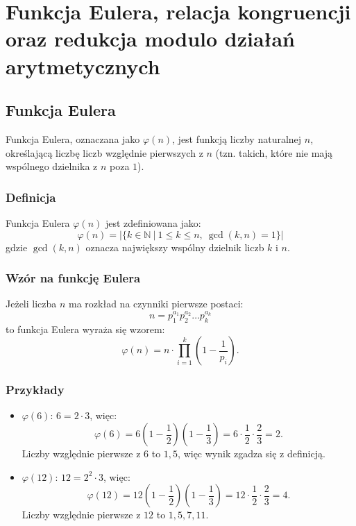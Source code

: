 \section{Funkcja Eulera, relacja kongruencji oraz redukcja modulo działań arytmetycznych}

\subsection{Funkcja Eulera}
Funkcja Eulera, oznaczana jako \(\varphi(n)\), jest funkcją liczby naturalnej \( n \), określającą liczbę liczb względnie pierwszych z \( n \) (tzn. takich, które nie mają wspólnego dzielnika z \( n \) poza \( 1 \)). 

\subsubsection{Definicja}
Funkcja Eulera \(\varphi(n)\) jest zdefiniowana jako:
\[
\varphi(n) = |\{ k \in \mathbb{N} \ | \ 1 \leq k \leq n, \ \gcd(k, n) = 1 \}|
\]
gdzie \(\gcd(k, n)\) oznacza największy wspólny dzielnik liczb \( k \) i \( n \).

\subsubsection{Wzór na funkcję Eulera}
Jeżeli liczba \( n \) ma rozkład na czynniki pierwsze postaci:
\[
n = p_1^{a_1} p_2^{a_2} \dots p_k^{a_k}
\]
to funkcja Eulera wyraża się wzorem:
\[
\varphi(n) = n \cdot \prod_{i=1}^{k} \left( 1 - \frac{1}{p_i} \right).
\]

\subsubsection{Przykłady}
\begin{itemize}
    \item \(\varphi(6)\): \( 6 = 2 \cdot 3 \), więc:
    \[
    \varphi(6) = 6 \left(1 - \frac{1}{2} \right) \left(1 - \frac{1}{3} \right) = 6 \cdot \frac{1}{2} \cdot \frac{2}{3} = 2.
    \]
    Liczby względnie pierwsze z \( 6 \) to \( 1, 5 \), więc wynik zgadza się z definicją.
    \item \(\varphi(12)\): \( 12 = 2^2 \cdot 3 \), więc:
    \[
    \varphi(12) = 12 \left(1 - \frac{1}{2} \right) \left(1 - \frac{1}{3} \right) = 12 \cdot \frac{1}{2} \cdot \frac{2}{3} = 4.
    \]
    Liczby względnie pierwsze z \( 12 \) to \( 1, 5, 7, 11 \).
\end{itemize}

